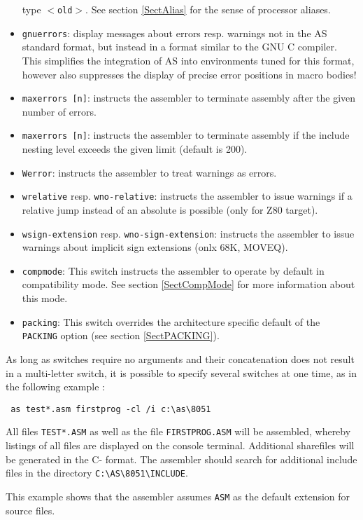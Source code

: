 \documentclass[12pt,twoside]{report}
\newcommand{\tty}[1]{{\tt #1}}
\newcommand{\asname}{{AS}}
\begin{document}
\begin{itemize}
{      type \tty{$<$old$>$}.  See section \ref{SectAlias} for the sense of
      processor aliases.}
\item{{\tt gnuerrors}: display messages about errors resp. warnings not
      in the \asname{} standard format, but instead in a format similar to the
      GNU C compiler.  This simplifies the integration of \asname{} into
      environments tuned for this format, however also suppresses the
      display of precise error positions in macro bodies!}
\item{{\tt maxerrors [n]}: instructs the assembler to terminate
      assembly after the given number of errors.}
\item{{\tt maxerrors [n]}: instructs the assembler to terminate
      assembly if the include nesting level exceeds the given limit
      (default is 200).}
\item{{\tt Werror}: instructs the assembler to treat warnings as errors.}
\item{{\tt wrelative} resp. {\tt wno-relative}: instructs the assembler
      to issue warnings if a relative jump instead of an absolute is
      possible (only for Z80 target).}
\item{{\tt wsign-extension} resp. {\tt wno-sign-extension}: instructs
      the assembler to issue warnings about implicit sign extensions
      (onlx 68K, MOVEQ).}
\item{\tty{compmode}: This switch instructs the assembler to operate by
      default in compatibility mode.  See section \ref{SectCompMode} for
      more information about this mode.}
\item{\tty{packing}: This switch overrides the architecture specific
      default of the {\tt PACKING} option (see section \ref{SectPACKING}).}
\end{itemize}
As long as switches require no arguments and their concatenation does
not result in a multi-letter switch, it is possible to specify several
switches at one time, as in the following example :
\begin{verbatim}
 as test*.asm firstprog -cl /i c:\as\8051
\end{verbatim}
All files \tty{TEST*.ASM} as well as the file \tty{FIRSTPROG.ASM} will be
assembled, whereby listings of all files are displayed on the
console terminal.  Additional sharefiles will be generated in the C-
format.  The assembler should search for additional include files
in the directory \verb!C:\AS\8051\INCLUDE!.

This example shows that the assembler assumes \tty{ASM} as the default
extension for source files.
\end{document}
